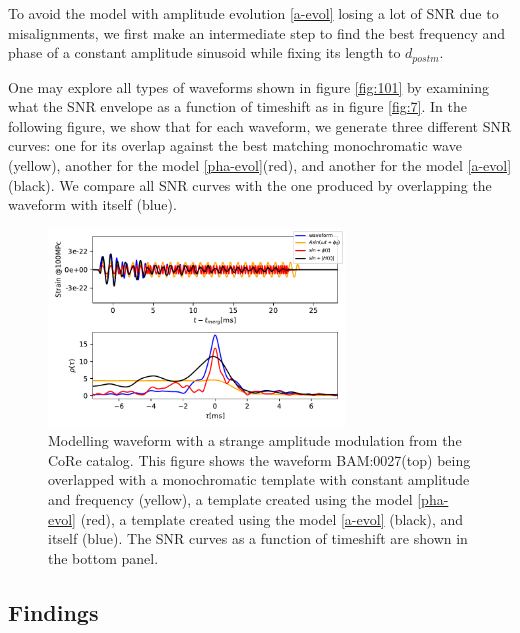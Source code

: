 To avoid the model with amplitude evolution \ref{a-evol} losing a lot of SNR due to misalignments, we first make an intermediate step to find the best frequency and phase of a constant amplitude sinusoid while fixing its length to $d_{postm}$.

One may explore all types of waveforms shown in figure \ref{fig:101} by examining what the SNR envelope as a function of timeshift as in figure \ref{fig:7}. In the following figure, we show that for each waveform, we generate three different SNR curves: one for its overlap against the best matching monochromatic wave (yellow), another for the model \ref{pha-evol}(red), and another for the model \ref{a-evol} (black). We compare all SNR curves with the one produced by overlapping the waveform with itself (blue).

\begin{figure}[hbt!]
\begin{center}
\includegraphics[width=0.7\textwidth, angle=0]{images/Data_analysis/results/phi-A0.pdf}
\captionsetup{width=0.8\textwidth}
\caption[Modelling waveform with a strange amplitude modulation from the CoRe catalog]{Modelling waveform with a strange amplitude modulation from the CoRe catalog. This figure shows the waveform BAM:0027(top) \cite{Dietrich:2018phi} being overlapped with a monochromatic template with constant amplitude and frequency (yellow), a template created using the model \ref{pha-evol} (red), a template created using the model \ref{a-evol} (black), and itself (blue). The SNR curves as a function of timeshift are shown in the bottom panel.}
\label{analysis}
\end{center}
\end{figure}
\FloatBarrier

\subsection*{Findings}

